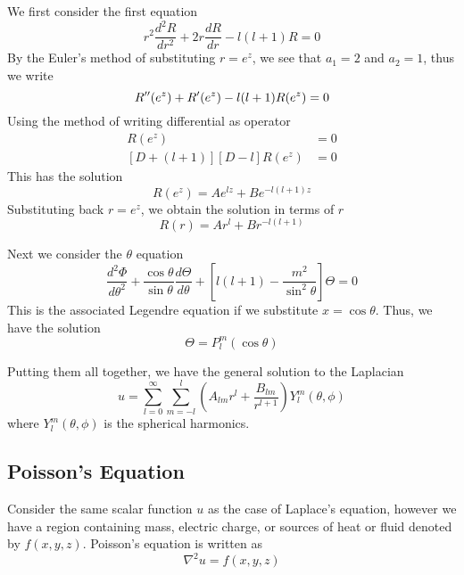 \documentclass[../main.tex]{subfiles}
\begin{document}
We first consider the first equation
\begin{equation*}
    r^2\frac{d^2R}{dr^2}+2r\frac{dR}{dr}-l(l+1)R=0
\end{equation*}
By the Euler's method of substituting $r=e^z$, we see that $a_1=2$ and $a_2=1$, thus we write
\begin{equation*}
    R''(e^z)+R'(e^z)-l(l+1)R(e^z)=0\\
\end{equation*}
Using the method of writing differential as operator
\begin{align*}
    [D^2+D-l(l+1)] R(e^z) & =0 \\
    [D+(l+1)][D-l]R(e^z)  & =0
\end{align*}
This has the solution
\begin{equation*}
    R(e^z)= Ae^{lz}+Be^{-l(l+1)z}
\end{equation*}
Substituting back $r=e^z$, we obtain the solution in terms of $r$
\begin{equation*}
    R(r)= Ar^{l}+Br^{-l(l+1)}
\end{equation*}

Next we consider the $\theta$ equation
\begin{equation*}
    \frac{d^2\Phi}{d\theta^2} +\frac{\cos \theta}{\sin\theta}\frac{d\Theta}{d\theta} +\left[l(l+1)-\frac{m^2}{\sin^2\theta} \right]\Theta =0
\end{equation*}
This is the associated Legendre equation if we substitute $x=\cos \theta$. 
 Thus, we have the solution
\begin{equation*}
    \Theta=P_l^m(\cos\theta)
\end{equation*}

Putting them all together, we have the general solution to the Laplacian
\begin{equation*}
    u=\sum_{l=0}^{\infty}\sum_{m=-l }^{l}\left(A_{lm}r^l +\frac{B_{lm}}{r^{l+1}}\right)Y_l^m(\theta,\phi)
\end{equation*}
where $Y_l^m(\theta,\phi)$ is the spherical harmonics.


\subsection*{Poisson’s Equation}
Consider the same scalar function $u$ as the case of Laplace's equation, however we have a region containing mass, electric charge, or sources of heat or fluid denoted by $f(x,y,z)$. 
Poisson's equation is written as
\begin{equation*}
    \nabla^2 u=f(x,y,z)
\end{equation*}
\end{document}
